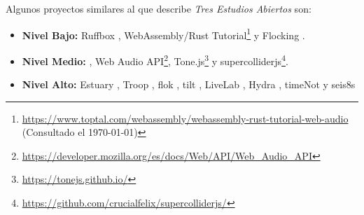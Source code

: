 
Algunos proyectos similares al que describe \textit{Tres Estudios Abiertos} son: 

\begin{itemize}

\item \textbf{Nivel Bajo:} Ruffbox \citep{ruffbox}, WebAssembly/Rust Tutorial\footnote{\url{https://www.toptal.com/webassembly/webassembly-rust-tutorial-web-audio} (Consultado el \today)} y Flocking \citep{flocking}.
\item \textbf{Nivel Medio:} \citep{supercolliderweb}, Web Audio API\footnote{\url{https://developer.mozilla.org/es/docs/Web/API/Web_Audio_API}}, Tone.js\footnote{\url{https://tonejs.github.io/}} y supercolliderjs\footnote{\url{https://github.com/crucialfelix/supercolliderjs/}}.
\item \textbf{Nivel Alto:} Estuary \citep{estuary}, Troop \citep{Troop}, flok \citep{flok}, tilt \citep{tilt}, LiveLab \citep{livelab}, Hydra \citep{hydra}, timeNot \citep{timenot} y seis8s \citep{seis8s}
  
\end{itemize}
